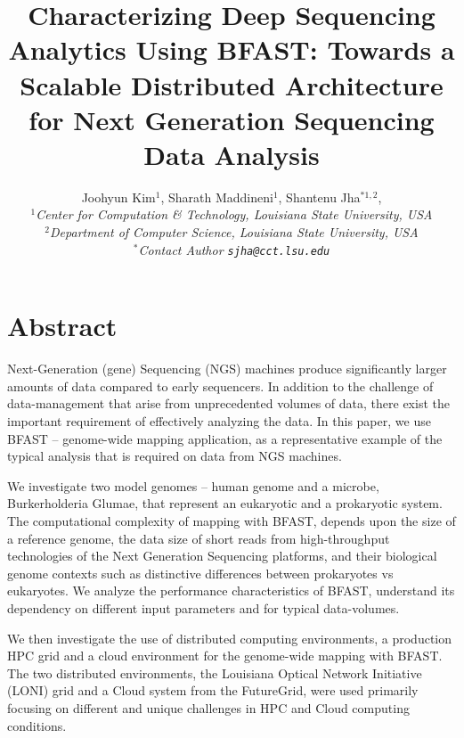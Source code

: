\documentclass[12pt]{article}
\begin{document}
\title{Characterizing Deep Sequencing Analytics Using BFAST: Towards a
  Scalable Distributed Architecture for Next Generation
  Sequencing Data Analysis}

\author{Joohyun Kim$^{1}$, Sharath Maddineni$^{1}$, Shantenu Jha$^{*1,2}$, \\
  \small{\emph{$^{1}$Center for Computation \& Technology, Louisiana State University, USA}}\\
  \small{\emph{$^{2}$Department of Computer Science, Louisiana State University, USA}}\\
  \small{\emph{$^{*}$Contact Author \texttt{sjha@cct.lsu.edu}}}
  }


\maketitle

\section*{Abstract}

Next-Generation (gene) Sequencing (NGS) machines produce significantly
larger amounts of data compared to early sequencers.  In addition to
the challenge of data-management that arise from unprecedented volumes
of data, there exist the important requirement of effectively
analyzing the data. In this paper, we use BFAST -- genome-wide mapping
application, as a representative example of the typical analysis that
is required on data from NGS machines.

We investigate two model genomes -- human genome and a microbe,
Burkerholderia Glumae, that represent an eukaryotic and a prokaryotic
system.  The computational complexity of mapping with BFAST, depends
upon the size of a reference genome, the data size of short reads from
high-throughput technologies of the Next Generation Sequencing
platforms, and their biological genome contexts such as distinctive
differences between prokaryotes vs eukaryotes.  We analyze the
performance characteristics of BFAST, understand its dependency on
different input parameters and for typical data-volumes.

We then investigate the use of distributed computing environments, a
production HPC grid and a cloud environment for the genome-wide
mapping with BFAST.  The two distributed environments, the Louisiana
Optical Network Initiative (LONI) grid and a Cloud system from the
FutureGrid, were used primarily focusing on different and unique
challenges in HPC and Cloud computing conditions.
\end{document}
